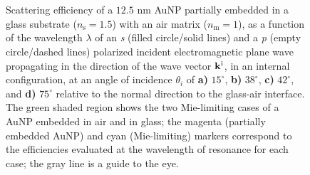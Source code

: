 \begin{figure}[t!]\footnotesize \centering
	\vspace*{3em}
    \hspace*{-.67\textwidth}%
        \begin{subfigure}{.735\textwidth}\caption{ }\label{sfig:Inc:Sca:15}\end{subfigure}%
        \begin{subfigure}{.25\textwidth}\caption{ }\label{sfig:Inc:Sca:38}\end{subfigure} \\[21.5em]
    \hspace*{-.67\textwidth}%
        \begin{subfigure}{.735\textwidth}\caption{ }\label{sfig:Inc:Sca:42}\end{subfigure}%
        \begin{subfigure}{.25\textwidth}\caption{ }\label{sfig:Inc:Sca:75}\end{subfigure} \\[-29.5em]
    \def\svgwidth{.95\textwidth}
    \vspace*{1.25em}
    \caption[Scattering Efficiency of a partially embedded 12.5 nm AuNP into a substrate Illuminated in an internal configuration at oblique incidence]{%
    Scattering efficiency of a $12.5$ nm AuNP partially embedded in a glass substrate ($n_\text{s} = 1.5$) with an air matrix ($n_\text{m} = 1$), as a function of the wavelength $\lambda$ of an \textit{s} (filled circle/solid lines) and a \textit{p} (empty circle/dashed lines) polarized incident electromagnetic plane wave propagating in the direction of the wave vector $\vb{k}^\text{i}$, in an internal configuration, at an angle of incidence $\theta_i$ of \textbf{a)} $15^\circ$, \textbf{b)} $38^\circ$, \textbf{c)} $42^\circ$, and \textbf{d)} $75^\circ$  relative to the normal direction to the glass-air interface. The green shaded region shows the two Mie-limiting cases of a AuNP embedded in air
and in glass; the magenta (partially embedded AuNP) and cyan (Mie-limiting) markers correspond to the efficiencies evaluated at the wavelength of resonance for each case; the gray  line is a guide  to the eye.
}
\label{fig:Inc:Sca}
\end{figure}

